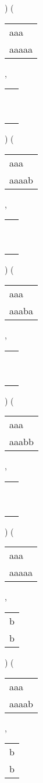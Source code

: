 ) 
 ( 
\begin{tabular}{|l|} \hline
aaa\ \  \\
aaaaa \\
\hline
\end{tabular} 
 , 
\begin{tabular}{|l|} \hline
\ \\ \ \\ \hline
\end{tabular} 
) 
 ( 
\begin{tabular}{|l|} \hline
aaa\ \  \\
aaaab \\
\hline
\end{tabular} 
 , 
\begin{tabular}{|l|} \hline
\ \\ \ \\ \hline
\end{tabular} 
) 
 ( 
\begin{tabular}{|l|} \hline
aaa\ \  \\
aaaba \\
\hline
\end{tabular} 
 , 
\begin{tabular}{|l|} \hline
\ \\ \ \\ \hline
\end{tabular} 
) 
 ( 
\begin{tabular}{|l|} \hline
aaa\ \  \\
aaabb \\
\hline
\end{tabular} 
 , 
\begin{tabular}{|l|} \hline
\ \\ \ \\ \hline
\end{tabular} 
) 
 ( 
\begin{tabular}{|l|} \hline
aaa\ \  \\
aaaaa \\
\hline
\end{tabular} 
 , 
\begin{tabular}{|l|} \hline
b \\
b \\
\hline
\end{tabular} 
) 
 ( 
\begin{tabular}{|l|} \hline
aaa\ \  \\
aaaab \\
\hline
\end{tabular} 
 , 
\begin{tabular}{|l|} \hline
b \\
b \\
\hline
\end{tabular} 
